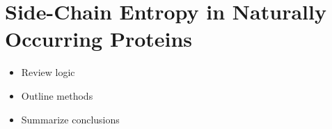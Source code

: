 \section*{Side-Chain Entropy in Naturally Occurring Proteins}
\label{sec:side_chain_entropy_of_x_ray_structures}

\begin{itemize}
	\item Review logic
	\item Outline methods
	\item Summarize conclusions
\end{itemize}

